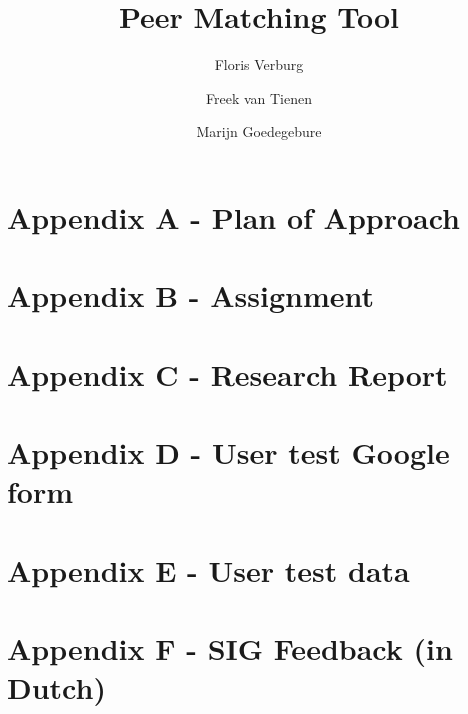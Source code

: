 \documentclass{tudelft-report}
\begin{document}
\frontmatter

\title[TI3800 Bachelorproject]{Peer Matching Tool}
\author{Floris Verburg \and Freek van Tienen \and Marijn Goedegebure}
\makecover







\tableofcontents

\mainmatter













\appendix

%
\chapter{Appendix A - Plan of Approach}


\chapter{Appendix B - Assignment}
\label{app:assignment}


\chapter{Appendix C - Research Report}


\chapter{Appendix D - User test Google form}
\label{app:survey}


\chapter{Appendix E - User test data}


\chapter{Appendix F - SIG Feedback (in Dutch)}
\label{app:sig}


%
%



\end{document}
